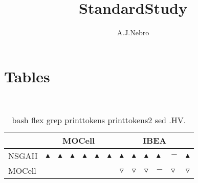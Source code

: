 \documentclass{article}
\title{StandardStudy}
\author{A.J.Nebro}
\begin{document}
\maketitle
\section{Tables}
\
\begin{table}
\caption{
bash flex grep printtokens printtokens2 sed 
.HV.}
\label{Table:
bash flex grep printtokens printtokens2 sed 
.HV.}
\centering
\begin{scriptsize}
\begin{tabular}{
| l | p{0.15cm }p{0.15cm }p{0.15cm }p{0.15cm }p{0.15cm }p{0.15cm } | p{0.15cm }p{0.15cm }p{0.15cm }p{0.15cm }p{0.15cm }p{0.15cm } | 
}
\hline \multicolumn{1}{|c|}{} & \multicolumn{6}{c|}{MOCell} & \multicolumn{6}{c|}{IBEA} \\
\hline 
NSGAII
 & 
$\blacktriangle$
&
$\blacktriangle$
&
$\blacktriangle$
&
$\blacktriangle$
&
$\blacktriangle$
&
$\blacktriangle$
 & 
$\blacktriangle$
&
$\blacktriangle$
&
$\blacktriangle$
&
$\blacktriangle$
&
$-$
&
$\blacktriangle$
 \\ 
MOCell
 & 
  
&
  
&
  
&
  
&
  
&
  
 & 
$\triangledown$
&
$\triangledown$
&
$\triangledown$
&
$-$
&
$\triangledown$
&
$\triangledown$
 \\ 
\hline
\end{tabular}
\end{scriptsize}
\end{table}
\end{document}
